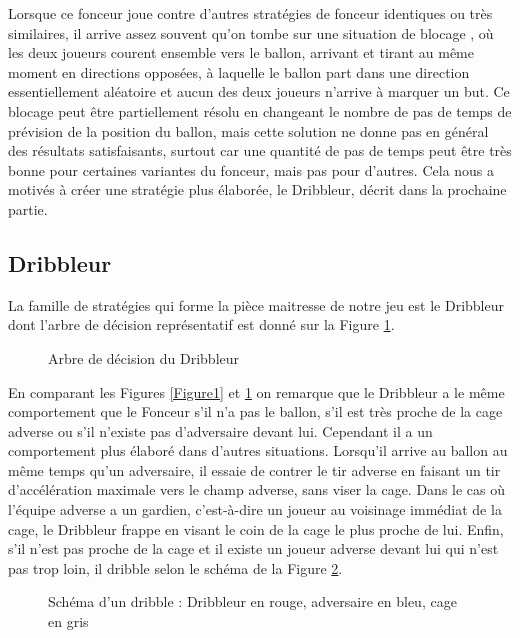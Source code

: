 \documentclass[a4paper,12pt]{article}
\begin{document}
Lorsque ce fonceur joue contre d'autres stratégies de fonceur identiques ou très similaires, il arrive assez souvent qu'on tombe sur une situation de \og blocage \fg, où les deux joueurs courent ensemble vers le ballon, arrivant et tirant au même moment en directions opposées, à laquelle le ballon part dans une direction essentiellement aléatoire et aucun des deux joueurs n'arrive à marquer un but. Ce blocage peut être partiellement résolu en changeant le nombre de pas de temps de prévision de la position du ballon, mais cette solution ne donne pas en général des résultats satisfaisants, surtout car une quantité de pas de temps peut être très bonne pour certaines variantes du fonceur, mais pas pour d'autres. Cela nous a motivés à créer une stratégie plus élaborée, le Dribbleur, décrit dans la prochaine partie.

\subsection{Dribbleur}

La famille de stratégies qui forme la pièce maitresse de notre jeu est le Dribbleur dont l'arbre de décision représentatif est donné sur la Figure \ref{Figure3}. 

\begin{figure}[ht]
\centering

\caption{Arbre de décision du Dribbleur}
\label{Figure3}
\end{figure}

En comparant les Figures \ref{Figure1} et \ref{Figure3} on remarque que le Dribbleur a le même comportement que le Fonceur s'il n'a pas le ballon, s'il est très proche de la cage adverse ou s'il n'existe pas d'adversaire devant lui. Cependant il a un comportement plus élaboré dans d'autres situations. Lorsqu'il arrive au ballon au même temps qu'un adversaire, il essaie de contrer le tir adverse en faisant un tir d'accélération maximale vers le champ adverse, sans viser la cage. Dans le cas où l’équipe adverse a un gardien, c'est-à-dire un joueur au voisinage immédiat de la cage, le Dribbleur frappe en visant le coin de la cage le plus proche de lui. Enfin, s'il n'est pas proche de la cage et il existe un joueur adverse devant lui qui n'est pas trop loin, il dribble selon le schéma de la Figure \ref{Figure4}.

\begin{figure}[ht]
\centering

\caption{Schéma d'un dribble : Dribbleur en rouge, adversaire en bleu, cage en gris}
\label{Figure4}
\end{figure}
\end{document}
